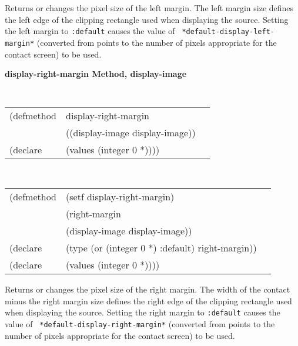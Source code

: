 \begin{flushright} \parbox[t]{6.125in}{
Returns or changes the pixel size of the
left margin.  The left margin size defines
the left edge of the clipping rectangle used when displaying the source.
Setting the left margin to {\tt :default} causes the value of {\tt
*default-display-left-margin*} (converted from points to the number of pixels
appropriate for the contact screen) to be used.
}
\end{flushright}




{\samepage  
{\large {\bf display-right-margin \hfill Method, display-image}}
\begin{flushright} \parbox[t]{6.125in}{
\tt
\begin{tabular}{lll}
\raggedright
(defmethod & display-right-margin & \\
& ((display-image  display-image)) \\
(declare & (values (integer 0 *))))
\end{tabular}
\rm

}\end{flushright}}

\begin{flushright} \parbox[t]{6.125in}{
\tt
\begin{tabular}{lll}
\raggedright
(defmethod & (setf display-right-margin) & \\
         & (right-margin \\
         & (display-image  display-image)) \\
(declare &(type (or (integer 0 *) :default)  right-margin))\\
(declare & (values (integer 0 *))))
\end{tabular}
\rm}
\end{flushright}

\begin{flushright} \parbox[t]{6.125in}{
Returns or changes the pixel size of the
right margin.  The width of the contact minus the right margin size defines
the right edge of the clipping rectangle used when displaying the source.
Setting the right margin to {\tt :default} causes the value of {\tt
*default-display-right-margin*} (converted from points to the number of pixels
appropriate for the contact screen) to be used.
}
\end{flushright}




